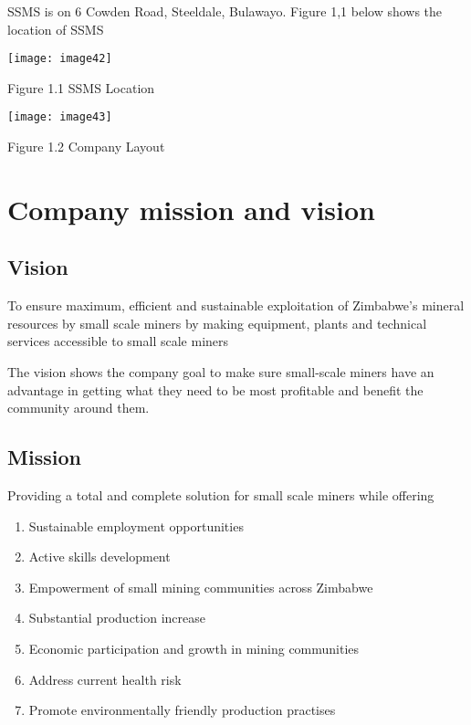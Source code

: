 \noindent SSMS is on 6 Cowden Road, Steeldale, Bulawayo. Figure 1,1 below shows the location of SSMS\par

\noindent \texttt{[image: image42]}

\noindent Figure 1.1 SSMS Location

\noindent \texttt{[image: image43]}

\noindent Figure 1.2 Company Layout


\section{ Company mission and vision}


\subsection{ Vision}

\noindent To ensure maximum, efficient and sustainable exploitation of Zimbabwe's mineral resources by small scale miners by making equipment, plants and technical services accessible to small scale miners\par

\noindent The vision shows the company goal to make sure small-scale miners have an advantage in getting what they need to be most profitable and benefit the community around them. \par


\subsection{ Mission}

\noindent Providing a total and complete solution for small scale miners while offering \par

\begin{enumerate}
\item  Sustainable employment opportunities

\item  Active skills development

\item  Empowerment of small mining communities across Zimbabwe

\item  Substantial production increase

\item  Economic participation and growth in mining communities

\item  Address current health risk

\item  Promote environmentally friendly production practises
\end{enumerate}


